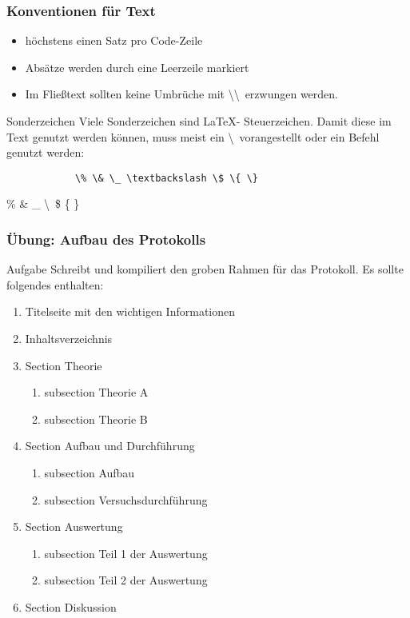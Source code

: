 \begin{frame}[fragile]
    \frametitle{Konventionen für Text}
    \begin{itemize}
        \item höchstens einen Satz pro Code-Zeile
        \item Absätze werden durch eine Leerzeile markiert
        \item Im Fließtext sollten keine Umbrüche mit \textbackslash\textbackslash \  erzwungen werden.
    \end{itemize}
    \begin{alertblock}{Sonderzeichen}
        Viele Sonderzeichen sind \LaTeX- Steuerzeichen. Damit diese im Text genutzt werden können,
        muss meist ein \textbackslash \ vorangestellt oder ein Befehl genutzt werden:
        \begin{center}
            \begin{lstlisting}
            \% \& \_ \textbackslash \$ \{ \}
            \end{lstlisting}
            \% \& \_ \textbackslash \ \$ \{ \}
        \end{center}
    \end{alertblock}
\end{frame}
\begin{frame}
    \frametitle{Übung: Aufbau des Protokolls}
    \begin{block}{Aufgabe}
        Schreibt und kompiliert den groben Rahmen für das Protokoll.
        Es sollte folgendes enthalten:
        \begin{enumerate}
            \item Titelseite mit den wichtigen Informationen
            \item Inhaltsverzeichnis
            \item Section Theorie
                \begin{enumerate}
                    \item subsection Theorie A
                    \item subsection Theorie B
                \end{enumerate}
            \item Section Aufbau und Durchführung
                \begin{enumerate}
                    \item subsection Aufbau
                    \item subsection Versuchsdurchführung
                \end{enumerate}
            \item Section Auswertung
                \begin{enumerate}
                    \item subsection Teil 1 der Auswertung
                    \item subsection Teil 2 der Auswertung
                \end{enumerate}
            \item Section Diskussion
        \end{enumerate}
    \end{block}
\end{frame}
